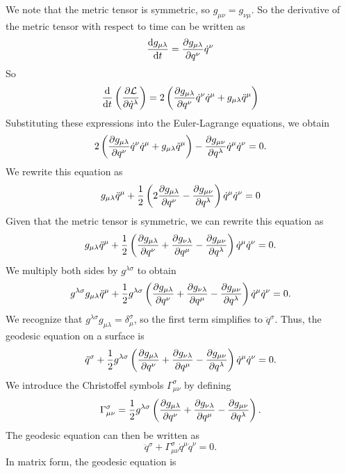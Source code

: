 \documentclass[12pt]{article}
\begin{document}
We note that the metric tensor is symmetric, so $g_{\mu\nu} = g_{\nu\mu}$.
So the derivative of the metric tensor with respect to time can be written as
\[
\dv{g_{\mu\lambda}}{t} = \pdv{g_{\mu\lambda}}{q^{\nu}} \dot{q}^{\nu} 
\]
So 
\[
\dv{t} \left( \pdv{\mathcal{L}}{\dot{q}^{\lambda}} \right) = 2 \left(\pdv{g_{\mu\lambda}}{q^{\nu}} \dot{q}^{\nu} \dot{q}^{\mu} + g_{\mu\lambda} \ddot{q}^{\mu} \right)
\] 
Substituting these expressions into the Euler-Lagrange equations, we obtain
\[
2 \left(\pdv{g_{\mu\lambda}}{q^{\nu}} \dot{q}^{\nu} \dot{q}^{\mu} + g_{\mu\lambda} \ddot{q}^{\mu} \right) - \pdv{g_{\mu\nu}}{q^{\lambda}} \dot{q}^{\mu} \dot{q}^{\nu} = 0.
\]
We rewrite this equation as
\[
g_{\mu\lambda} \ddot{q}^{\mu} + \frac{1}{2} \left(2\pdv{g_{\mu\lambda}}{q^{\nu}} -  \pdv{g_{\mu\nu}}{q^{\lambda}} \right) \dot{q}^{\mu} \dot{q}^{\nu} = 0
\]
Given that the metric tensor is symmetric, we can rewrite this equation as
\[
g_{\mu\lambda} \ddot{q}^{\mu} + \frac{1}{2} \left( \pdv{g_{\mu\lambda}}{q^{\nu}} + \pdv{g_{\nu\lambda}}{q^{\mu}} - \pdv{g_{\mu\nu}}{q^{\lambda}} \right) \dot{q}^{\mu} \dot{q}^{\nu} = 0.
\]
We multiply both sides by \(g^{\lambda\sigma}\) to obtain
\[
g^{\lambda\sigma} g_{\mu\lambda} \ddot{q}^{\mu} + \frac{1}{2} g^{\lambda\sigma} \left( \pdv{g_{\mu\lambda}}{q^{\nu}} + \pdv{g_{\nu\lambda}}{q^{\mu}} - \pdv{g_{\mu\nu}}{q^{\lambda}} \right) \dot{q}^{\mu} \dot{q}^{\nu} = 0.
\]
We recognize that \(g^{\lambda\sigma} g_{\mu\lambda} = \delta_{\mu}^{\sigma}\), so the first term simplifies to \(\ddot{q}^{\sigma}\).
Thus, the geodesic equation on a surface is
\[
\ddot{q}^{\sigma} + \frac{1}{2} g^{\lambda\sigma} \left( \pdv{g_{\mu\lambda}}{q^{\nu}} + \pdv{g_{\nu\lambda}}{q^{\mu}} - \pdv{g_{\mu\nu}}{q^{\lambda}} \right) \dot{q}^{\mu} \dot{q}^{\nu} = 0.
\]
We introduce the Christoffel symbols \(\Gamma_{\mu\nu}^{\sigma}\) by defining
\[
   \Gamma_{\mu\nu}^{\sigma} = \frac{1}{2} g^{\lambda\sigma} \left( \pdv{g_{\mu\lambda}}{q^{\nu}} + \pdv{g_{\nu\lambda}}{q^{\mu}} - \pdv{g_{\mu\nu}}{q^{\lambda}} \right).
\]
The geodesic equation can then be written as
\begin{equation}
    \ddot{q}^{\sigma} + \Gamma_{\mu\nu}^{\sigma} \dot{q}^{\mu} \dot{q}^{\nu} = 0.
\end{equation}
In matrix form, the geodesic equation is
\end{document}
